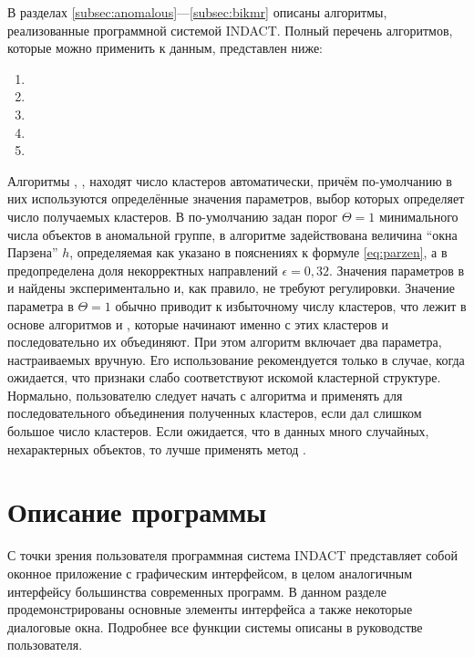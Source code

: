 \documentclass[12pt]{diploma}
\begin{document}
	В разделах \ref{subsec:anomalous}---\ref{subsec:bikmr} описаны алгоритмы, реализованные программной системой INDACT. Полный  перечень алгоритмов, которые можно применить к данным, представлен ниже:
	
	\begin{enumerate}
		\item \ikmeans
		\item \AWard
		\item \AWardpb
		\item \dePDDP
		\item \BiKMR
	\end{enumerate}
	
	
	Алгоритмы \ikmeans, \dePDDP, \BiKMR находят число кластеров автоматически, причём по-умолчанию в них используются определённые значения параметров, выбор которых определяет число получаемых кластеров. В \ikmeans по-умолчанию задан порог $ \Theta=1 $ минимального числа объектов в аномальной группе, в алгоритме \dePDDP задействована величина ``окна Парзена'' $ h $, определяемая как указано в пояснениях к формуле \eqref{eq:parzen}, а в \BiKMR предопределена доля некорректных направлений $ \epsilon=0,32 $. Значения параметров в \dePDDP и \BiKMR найдены  экспериментально и, как правило, не требуют регулировки. Значение параметра в \ikmeans $ \Theta=1 $ обычно приводит к избыточному числу кластеров, что лежит в основе алгоритмов \AWard и \AWardpb, которые начинают именно с этих кластеров и последовательно их объединяют. При этом алгоритм \AWardpb включает два параметра, настраиваемых вручную. Его использование рекомендуется только в случае, когда ожидается, что признаки слабо соответствуют искомой кластерной структуре. Нормально, пользователю следует начать с алгоритма \ikmeans и применять \AWard для последовательного объединения полученных кластеров, если \ikmeans дал слишком большое число кластеров. Если ожидается, что в данных много случайных, нехарактерных объектов, то лучше применять метод \BiKMR.
	
	\section{Описание программы}
	
	С точки зрения пользователя программная система INDACT представляет собой оконное приложение с графическим интерфейсом, в целом аналогичным интерфейсу большинства современных программ. В данном разделе продемонстрированы основные элементы интерфейса а также некоторые диалоговые окна. Подробнее все функции системы описаны в руководстве пользователя.
	
\end{document}
